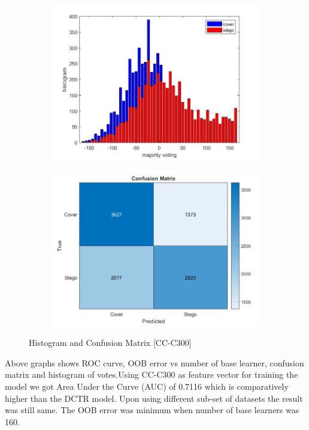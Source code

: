 \begin{figure}[H]
    \begin{subfigure}[b]{0.5\textwidth}
        \includegraphics[width=\textwidth]{img/histo300.jpg}
    \end{subfigure}
    \hfill
    \begin{subfigure}[b]{0.5\textwidth}
        \includegraphics[width=\textwidth]{img/confusion300.jpg}
    \end{subfigure}
    \caption{Histogram and Confusion Matrix [CC-C300]}
\end{figure}
\begin{flushleft}
Above graphs shows ROC curve, OOB error vs number of base learner, confusion matrix and histogram of votes.Using CC-C300 as feature vector for training the model we got Area Under the Curve (AUC) of 0.7116 which is comparatively higher than the DCTR model. Upon using different sub-set of datasets the result was still same. The OOB error was minimum when number of base learners was 160.
\end{flushleft}
\clearpage
